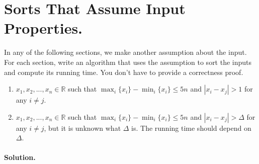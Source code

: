  \section{Sorts That Assume Input Properties.}
 In any of the following sections, we make another assumption about the input. For each section, write an algorithm that uses the assumption to sort the inputs and compute its running time. You don't have to provide a correctness proof.
 \begin{enumerate} 
   \item $x_{1},x_{2},...,x_{n} \in \mathbb{R}$ such that $\max_{i} \{x_{i}\} - \min_{i} \{x_{i}\} \leq 5n$ and $|x_{i} - x_{j}| > 1$ for any $i \neq j$.
   \item $x_1, x_2, ..., x_n \in \mathbb{R}$ such that $\max_{i} \{x_{i}\} -\min_{i} \{x_{i}\} \leq 5n$ and $|x_{i} - x_{j}| > \Delta$ for any $i \neq j$, but it is unknown what $\Delta$ is. The running time should depend on $\Delta$.
 \end{enumerate}
\ifdefined\SOLUTION

  \paragraph{Solution.} \\

